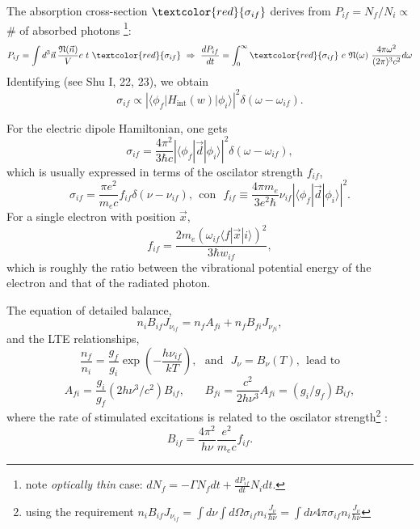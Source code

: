 The absorption cross-section $\textcolor{red}{\sigma_{if}}$ derives
from $ P_{if} = N_f/N_i \propto $ \# of absorbed photons
\footnote{note   {\em optically thin} case: $dN_f = -\Gamma N_f dt + \frac{d P_{if}} {dt} N_i dt $.}: 
\[ P_{if} = \int d^3\vec{n} \, \frac {{\frak N}(\vec{n})} {V}   c~ t~  \textcolor{red}{\sigma_{if}}  ~ \Rightarrow  ~  \frac{dP_{if}}{dt} = \int_0^\infty \textcolor{red}{\sigma_{if}}~ c~ {\frak N}(\omega) ~\frac{4 \pi \omega^2}{(2\pi)^3 c^2} d\omega\]
Identifying (see Shu I, 22, 23), we obtain
\[ \sigma_{if} \propto    \left|  \langle \phi_f| H_\mathrm{int}(w) |\phi_i \rangle \right|^2   \delta(\omega-\omega_{if}).  \]



For the electric dipole Hamiltonian, one gets
 \[ \sigma_{if} = \frac{4 \pi^2}{3  \hbar c }     \left|  \langle \phi_f| \vec{d} |\phi_i \rangle \right|^2   \delta(\omega-\omega_{if}),  \]
which is usually expressed in terms of the oscilator strength $f_{if}$,
 \[ \sigma_{if} = \frac{\pi e^2}{m_e c }  f_{if}     \delta(\nu-\nu_{if}),  ~~\text{con} ~~~
f_{if} \equiv \frac{ 4 \pi m_e } {3 e^2 \hbar} \nu_{if} \left| \langle
\phi_f| \vec{d} |\phi_i \rangle \right|^2. \] For a single electron
 with position $\vec{x}$, \[ f_{if} = \frac{ 2 m_e ( \omega_{if}
\langle f | \vec{x}| i \rangle )^2}{3 \hbar w_{if}}, \] which is
roughly the ratio between the vibrational potential energy of the
electron and that of the radiated photon.




The equation of detailed balance, 
\[n_i B_{if} J_{\nu_{if}} = n_f A_{fi} + n_f B_{fi} J_{\nu_{fi}}, \]
and the LTE relationships,
\[\frac{n_f}{n_i} = \frac{g_f}{g_i} \exp(-\frac{h\nu_{if}}{kT}),
~~~\text{and}~~~J_{\nu} = B_{\nu}(T),~~\text{lead~to} \]
\[ A_{fi} = \frac{g_i}{g_f} (2 h \nu^3 / c^2 ) B_{if} , ~~~~~~~~ B_{fi} = \frac{c^2}{2 h \nu^3} A_{fi} = (g_i / g_f ) B_{if}, \]
where the rate of stimulated  excitations is related to the
oscilator strength\footnote{using the requirement $n_i B_{if} J_{\nu_{if}} = \int d\nu \int d\Omega
\sigma_{if} n_i \frac{J_\nu}{h\nu} = \int d\nu  4\pi \sigma_{if} n_i \frac{J_\nu}{h\nu}$}
:
\[ B_{if} = \frac{4 \pi^2 }{h \nu} \frac{e^2}{m_e c} f_{if}.\]



